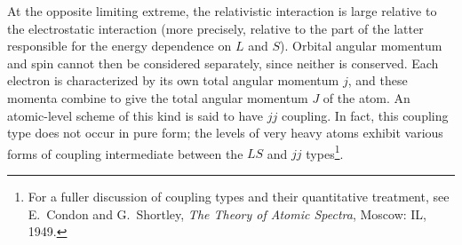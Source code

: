 At the opposite limiting extreme, the relativistic interaction is large relative to the electrostatic interaction (more precisely, relative to the part of the latter responsible for the energy dependence on $L$ and $S$). Orbital angular momentum and spin cannot then be considered separately, since neither is conserved. Each electron is characterized by its own total angular momentum $j$, and these momenta combine to give the total angular momentum $J$ of the atom. An atomic-level scheme of this kind is said to have $jj$ coupling. In fact, this coupling type does not occur in pure form; the levels of very heavy atoms exhibit various forms of coupling intermediate between the $LS$ and $jj$ types\footnote{For a fuller discussion of coupling types and their quantitative treatment, see E.~Condon and G.~Shortley, \emph{The Theory of Atomic Spectra}, Moscow: IL, 1949.}.
